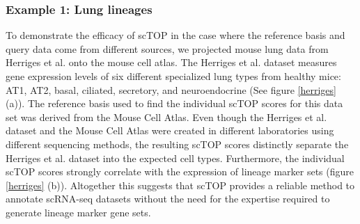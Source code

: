 \documentclass[aps,superscriptaddress, notitlepage,longbibliography]{revtex4-1}
\begin{document}
\subsubsection{Example 1: Lung lineages}
To demonstrate the efficacy of scTOP in the case where the reference basis and query data come from different sources, we projected mouse lung data from Herriges et al. \cite{herriges_durable_2022} onto the mouse cell atlas. The Herriges et al. dataset measures gene expression levels of six different specialized lung types from healthy mice: AT1, AT2, basal, ciliated, secretory, and neuroendocrine (See figure \ref{herriges} (a)). The reference basis used to find the individual scTOP scores for this data set was derived from the Mouse Cell Atlas. Even though the Herriges et al. dataset and the Mouse Cell Atlas were created in different laboratories using different sequencing methods, the resulting scTOP scores distinctly separate the Herriges et al. dataset into the expected cell types. Furthermore, the individual scTOP scores strongly correlate with the expression of lineage marker sets (figure \ref{herriges} (b)).  Altogether this suggests that scTOP provides a reliable method to annotate scRNA-seq datasets without the need for the expertise required to generate lineage marker gene sets.
\end{document}
